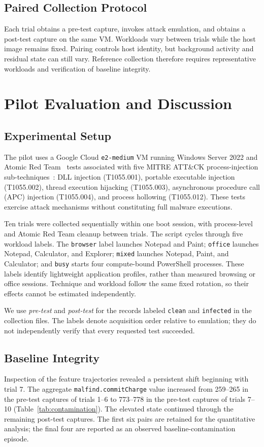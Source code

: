 \documentclass[conference]{IEEEtran}
\begin{document}
\subsection{Paired Collection Protocol}
Each trial obtains a pre-test capture, invokes attack emulation, and obtains
a post-test capture on the same VM. Workloads vary between trials while the
host image remains fixed. Pairing controls host identity, but background
activity and residual state can still vary. Reference collection therefore
requires representative workloads and verification of baseline integrity.

\section{Pilot Evaluation and Discussion}
\label{sec:evaluation}

\subsection{Experimental Setup}
The pilot uses a Google Cloud \texttt{e2-medium} VM running Windows Server 2022
and Atomic Red Team~\cite{atomicredteam} tests associated with five MITRE
ATT\&CK process-injection sub-techniques~\cite{mitre1055}: DLL injection
(T1055.001), portable executable injection (T1055.002), thread execution
hijacking (T1055.003), asynchronous procedure call (APC) injection (T1055.004),
and process hollowing (T1055.012). These tests exercise attack mechanisms
without constituting full malware executions.

Ten trials were collected sequentially within one boot session, with
process-level and Atomic Red Team cleanup between trials. The script cycles
through five workload labels. The \texttt{browser} label launches Notepad and
Paint; \texttt{office} launches Notepad, Calculator, and Explorer;
\texttt{mixed} launches Notepad, Paint, and Calculator; and \texttt{busy}
starts four compute-bound PowerShell processes. These labels identify
lightweight application profiles, rather than measured browsing or office
sessions. Technique and workload follow the same fixed rotation, so their
effects cannot be estimated independently.

We use \emph{pre-test} and \emph{post-test} for the records labeled
\texttt{clean} and \texttt{infected} in the collection files. The labels
denote acquisition order relative to emulation; they do not independently
verify that every requested test succeeded.

\subsection{Baseline Integrity}
Inspection of the feature trajectories revealed a persistent shift beginning
with trial 7. The aggregate \texttt{malfind.commitCharge} value increased from
259--265 in the pre-test captures of trials 1--6 to 773--778 in the pre-test
captures of trials 7--10 (Table~\ref{tab:contamination}). The elevated state
continued through the remaining post-test captures. The first six pairs are
retained for the quantitative analysis; the final four are reported as an
observed baseline-contamination episode.
\end{document}

